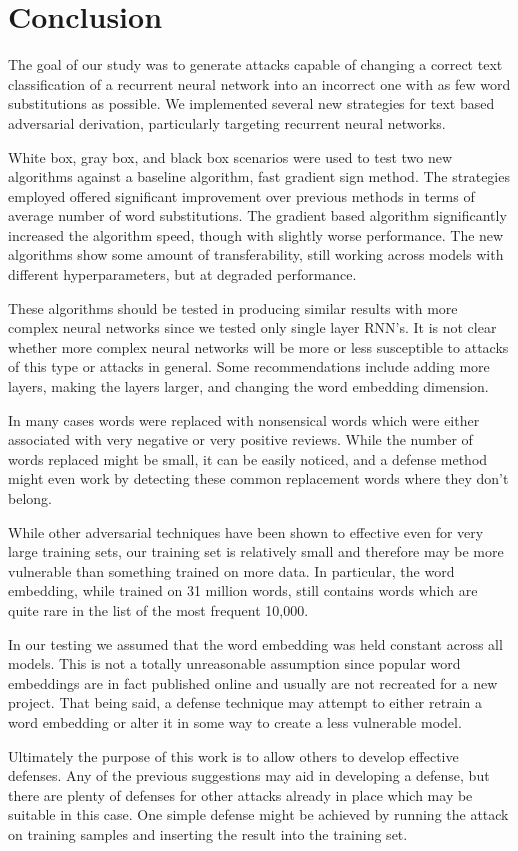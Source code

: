 \chapter{Conclusion}
The goal of our study was to generate attacks capable of changing a correct text classification of a recurrent neural network into an incorrect one with as few word substitutions as possible.  We implemented several new strategies for text based adversarial derivation, particularly targeting recurrent neural networks.  

White box, gray box, and black box scenarios were used to test two new algorithms against a baseline algorithm, fast gradient sign method.  The strategies employed offered significant improvement over previous methods in terms of average number of word substitutions.  The gradient based algorithm significantly increased the algorithm speed, though with slightly worse performance.  The new algorithms show some amount of transferability, still working across models with different hyperparameters, but at degraded performance.  

These algorithms should be tested in producing similar results with more complex neural networks since we tested only single layer RNN's.  It is not clear whether more complex neural networks will be more or less susceptible to attacks of this type or attacks in general.  Some recommendations include adding more layers, making the layers larger, and changing the word embedding dimension.

In many cases words were replaced with nonsensical words which were either associated with very negative or very positive reviews.  While the number of words replaced might be small, it can be easily noticed, and a defense method might even work by detecting these common replacement words where they don't belong.

While other adversarial techniques have been shown to effective even for very large training sets, our training set is relatively small and therefore may be more vulnerable than something trained on more data.  In particular, the word embedding, while trained on 31 million words, still contains words which are quite rare in the list of the most frequent 10,000.

In our testing we assumed that the word embedding was held constant across all models.  This is not a totally unreasonable assumption since popular word embeddings are in fact published online and usually are not recreated for a new project.  That being said, a defense technique may attempt to either retrain a word embedding or alter it in some way to create a less vulnerable model.

Ultimately the purpose of this work is to allow others to develop effective defenses.  Any of the previous suggestions may aid in developing a defense, but there are plenty of defenses for other attacks already in place which may be suitable in this case.  One simple defense might be achieved by running the attack on training samples and inserting the result into the training set.
